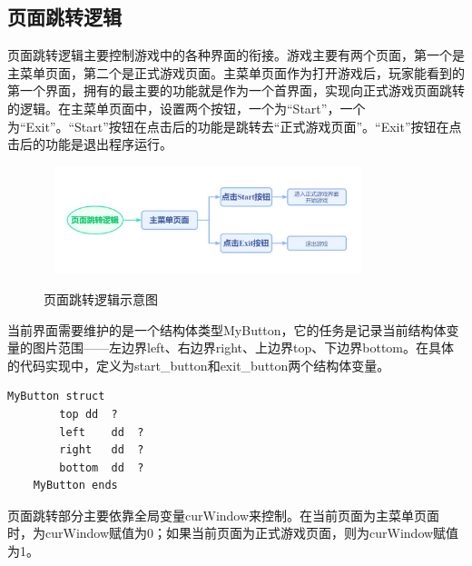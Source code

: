 \subsection{页面跳转逻辑}
页面跳转逻辑主要控制游戏中的各种界面的衔接。游戏主要有两个页面，第一个是主菜单页面，第二个是正式游戏页面。主菜单页面作为打开游戏后，玩家能看到的第一个界面，拥有的最主要的功能就是作为一个首界面，实现向正式游戏页面跳转的逻辑。在主菜单页面中，设置两个按钮，一个为“Start”，一个为“Exit”。“Start”按钮在点击后的功能是跳转去“正式游戏页面”。“Exit”按钮在点击后的功能是退出程序运行。
\begin{figure}[htbp]
    \vspace{13pt} %
    \
    \centering
    \includegraphics[width=0.8\textwidth]{images/3-2.jpg}
    \caption{页面跳转逻辑示意图}%
\end{figure}
\par
当前界面需要维护的是一个结构体类型MyButton，它的任务是记录当前结构体变量的图片范围——左边界left、右边界right、上边界top、下边界bottom。在具体的代码实现中，定义为start\_button和exit\_button两个结构体变量。
\begin{lstlisting}[language={[x86masm]Assembler}]
    MyButton struct
        top	dd	?
        left	dd	?
        right	dd	?
        bottom	dd	?
    MyButton ends
\end{lstlisting}
\par
页面跳转部分主要依靠全局变量curWindow来控制。在当前页面为主菜单页面时，为curWindow赋值为0；如果当前页面为正式游戏页面，则为curWindow赋值为1。
